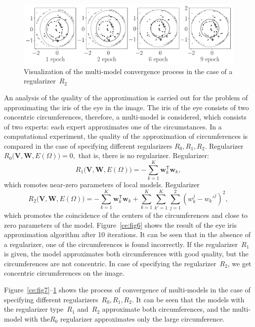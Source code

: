 \begin{figure}
     \includegraphics[width=\textwidth]{figures/experiment_real_regular}
     \caption{Visualization of the multi-model convergence process in the case of a regularizer~$R_2$}
    \label{ce:fig9}
\end{figure}

An analysis of the quality of the approximation is carried out for the problem of approximating the iris of the eye in the image. The iris of the eye consists of two concentric circumferences, therefore, a multi-model is considered, which consists of two experts: each expert approximates one of the circumstances. In a computational experiment, the quality of the approximation of circumferences is compared in the case of specifying different regularizers $R_0, R_1, R_2$. Regularizer$R_0\bigl(\mathbf{V}, \mathbf{W}, E(\Omega)\bigr)=0,$ that is, there is no regularizer. Regularizer:
\[
R_1\bigl(\mathbf{V}, \mathbf{W}, E(\Omega)\bigr)= -\sum_{k=1}^{K}\mathbf{w}_k^{\mathsf{T}}\mathbf{w}_k,
\]
which romotes near-zero parameters of local models.
Regularizer 
\[
R_2\bigl(\mathbf{V}, \mathbf{W}, E(\Omega)\bigr)= -\sum_{k=1}^{K}\mathbf{w}_k^{\mathsf{T}}\mathbf{w}_k + \sum_{k=1}^{K}\sum_{k'=1}^{K}\sum_{j=1}^2\left(w_k^j-w_k'^j\right)^2,\]
which promotes the coincidence of the centers of the circumferences and close to zero parameters of the model.
Figure~\ref{ce:fig6} shows the result of the eye iris approximation algorithm after 10 iterations. It can be seen that in the absence of a regularizer, one of the circumferences is found incorrectly. If the regularizer~$R_1 $ is given, the model approximates both circumferences with good quality, but the circumferences are not concentric. In case of specifying the regularizer~$R_2$, we get concentric circumferences on the image.

Figure~\ref{ce:fig7}--\ref{ce:fig9} shows the process of convergence of multi-models in the case of specifying different regularizers~$R_0, R_1, R_2$. It can be seen that the models with the regularizer type~$R_1$ and~$R_2$ approximate both circumferences, and the multi-model with the$R_0$ regularizer approximates only the large circumference.


